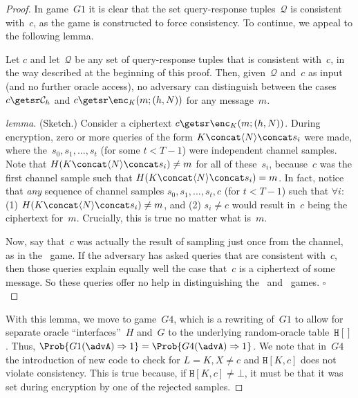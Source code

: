 \begin{proof}
In game~$G1$ it is clear that the set query-response tuples~$\mathcal{Q}$ is consistent with~$c$, as the game is constructed to force consistency. To continue, we appeal to the following lemma.

\begin{lemma}Let $c$ and let~$\mathcal{Q}$ be any set of query-response tuples that is consistent with~$c$, in the way described at the beginning of this proof.  Then, given~$\mathcal{Q}$ and~$c$ as input (and no further oracle access), no adversary can distinguish between the cases $c\getsr\mathcal{C}_h$ and $c \getsr \enc_K(m;(h,N))$ for any message~$m$. 
\end{lemma}
\begin{proof}[lemma](Sketch.) Consider a ciphertext $c \getsr \enc_K(m;(h,N))$.  During encryption, zero or more queries of the form $K \concat \langle N \rangle \concat s_i$ were made, where the~$s_0,s_1,\ldots,s_t$ (for some $t<T-1$) were independent channel samples. Note that $H(K \concat \langle N \rangle \concat s_i) \neq m$ for all of these~$s_i$, because~$c$ was the first channel sample such that $H(K \concat \langle N \rangle \concat s_i) = m$.   In fact, notice that \textit{any} sequence of channel samples $s_0,s_1,\ldots,s_t,c$ (for $t < T-1$) such that $\forall i$: 
(1) $H(K \concat \langle N \rangle \concat s_i) \neq m$, and (2) $s_i \neq c$ would result in~$c$ being the ciphertext for~$m$.  Crucially, this is true no matter what is~$m$.

Now, say that~$c$ was actually the result of sampling just once from the channel, as in the \ game.  If the adversary has asked queries that are consistent with~$c$, then those queries explain equally well the case that~$c$ is a ciphertext of some message.  So these queries offer no help in distinguishing the \ and \ games. \hfill$ \square$ \\
\end{proof}


With this lemma, we move to game~$G4$, which is a rewriting of~$G1$ to allow for separate oracle ``interfaces''~$H$ and~$G$ to the underlying random-oracle table~$\mathtt{H}[]$.  Thus, $\Prob{G1(\advA)\outputs 1} = \Prob{G4(\advA)\outputs 1}$.  We note that in~$G4$ the introduction of new code to check for $L=K,X\neq c$ and $\mathtt{H}[K,c]$ does not violate consistency.  This is true because, if $\mathtt{H}[K,c]\neq\bot$, it must be that it was set during encryption by one of the rejected samples.


\end{proof}
